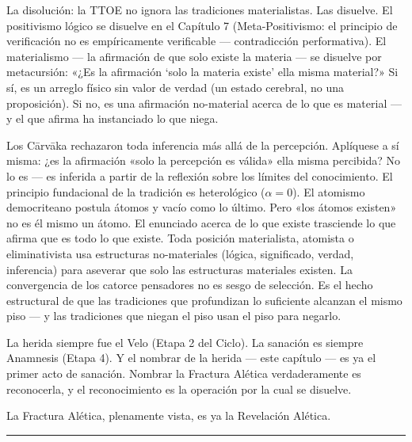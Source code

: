 \documentclass[10pt, openany, oneside]{book}
\begin{document}
La disolución: la TTOE no ignora las tradiciones materialistas. Las disuelve. El positivismo lógico se disuelve en el Capítulo 7 (Meta-Positivismo: el principio de verificación no es empíricamente verificable --- contradicción performativa). El materialismo --- la afirmación de que solo existe la materia --- se disuelve por metacursión: «¿Es la afirmación `solo la materia existe' ella misma material?» Si sí, es un arreglo físico sin valor de verdad (un estado cerebral, no una proposición). Si no, es una afirmación no-material acerca de lo que es material --- y el que afirma ha instanciado lo que niega.

Los C\={a}rv\={a}ka rechazaron toda inferencia más allá de la percepción. Aplíquese a sí misma: ¿es la afirmación «solo la percepción es válida» ella misma percibida? No lo es --- es inferida a partir de la reflexión sobre los límites del conocimiento. El principio fundacional de la tradición es heterológico ($\alpha = 0$). El atomismo democriteano postula átomos y vacío como lo último. Pero «los átomos existen» no es él mismo un átomo. El enunciado acerca de lo que existe trasciende lo que afirma que es todo lo que existe. Toda posición materialista, atomista o eliminativista usa estructuras no-materiales (lógica, significado, verdad, inferencia) para aseverar que solo las estructuras materiales existen. La convergencia de los catorce pensadores no es sesgo de selección. Es el hecho estructural de que las tradiciones que profundizan lo suficiente alcanzan el mismo piso --- y las tradiciones que niegan el piso usan el piso para negarlo.

\vspace{1.5em}


\noindent La herida siempre fue el Velo (Etapa 2 del Ciclo). La sanación es siempre Anamnesis (Etapa 4). Y el nombrar de la herida --- este capítulo --- es ya el primer acto de sanación. Nombrar la Fractura Alética verdaderamente es reconocerla, y el reconocimiento es la operación por la cual se disuelve.

La Fractura Alética, plenamente vista, es ya la Revelación Alética.

\vspace{2em}

\begin{center}
    \rule{0.15\textwidth}{0.3pt}
\end{center}
\end{document}
